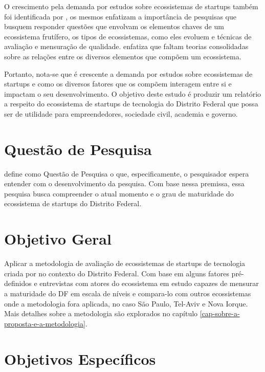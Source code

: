 O crescimento pela demanda por estudos sobre ecossistemas de startups também foi identificada por , os mesmos enfatizam a importância de pesquisas que busquem responder questões que envolvam os elementos chaves de um ecossistema frutífero, os tipos de ecossistemas, como eles evoluem e técnicas de avaliação e mensuração de qualidade.  enfatiza que faltam teorias consolidadas sobre as relações entre os diversos elementos que compõem um ecossistema.

Portanto, nota-se que é crescente a demanda por estudos sobre ecossistemas de startups e como os diversos fatores que os compõem interagem entre si e impactam o seu desenvolvimento. O objetivo deste estudo é produzir um relatório a respeito do ecossistema de startups de tecnologia do Distrito Federal que possa ser de utilidade para empreendedores, sociedade civil, academia e governo. 

\section{Questão de Pesquisa}
\label{section:questao_de_pesquisa}

 define como Questão de Pesquisa o que, especificamente, o pesquisador espera entender com o desenvolvimento da pesquisa. Com base nessa premissa, essa pesquisa busca compreender o atual momento e o grau de maturidade do ecossistema de startups do Distrito Federal.

\section{Objetivo Geral}
\label{section:objetivo_geral}

Aplicar a metodologia de avaliação de ecossistemas de startups de tecnologia criada por  no contexto do Distrito Federal. Com base em alguns fatores pré-definidos e entrevistas com atores do ecossistema em estudo capazes de mensurar a maturidade do DF em escala de níveis e compara-lo com outros ecossistemas onde a metodologia fora aplicada, no caso São Paulo, Tel-Aviv e Nova Iorque. Mais detalhes sobre a metodologia são explorados no capítulo \ref{cap-sobre-a-proposta-e-a-metodologia}.

\section{Objetivos Específicos}
\label{section:objetivos_especificos}


